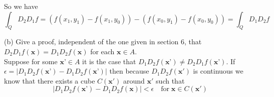 \documentclass[11pt,reqno]{article}
\begin{document}
\noindent So we have 
\[ \int_Q D_2 D_1 f = (f(x_1,y_1) - f(x_1,y_0)) - (f(x_0,y_1) - f(x_0,y_0)) = \int_Q D_1 D_2 f \]

\noindent (b) Give a proof, independent of the one given in section 6, that $D_2 D_1 f(\textbf{x}) = D_1 D_2 f(\textbf{x})$ for each $\textbf{x} \in A$.\\

Suppose for some $\textbf{x'} \in A$ it is the case that $D_1 D_2 f(\textbf{x'}) \neq D_2 D_1 f(\textbf{x'})$. If $\epsilon = |D_1 D_2 f(\textbf{x'}) - D_1 D_2 f(\textbf{x'})|$ then because $D_1 D_2 f(\textbf{x}')$ is continuous we know that there exists a cube $C(\textbf{x}')$ around $\textbf{x}'$ such that 
\[ |D_1 D_2 f(\textbf{x'}) - D_1 D_2 f(\textbf{x})| <  \epsilon \quad \text{for} \; \textbf{x} \in C(\textbf{x}')\]
\end{document}
